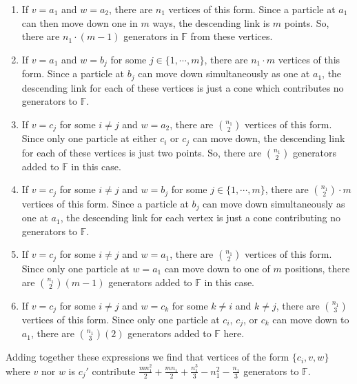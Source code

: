 \begin{enumerate}
    \item If \(v = a_1\) and \(w = a_2\), there are \(n_1\) vertices of this form.
    Since a particle at \(a_1\) can then move down one in \(m\) ways, the descending link is \(m\) points.
    So, there are \(n_1 \cdot (m - 1)\) generators in \(\mathbb{F}\) from these vertices.

    \item If \(v = a_1\) and \(w = b_j\) for some \(j \in \{1, \cdots, m\}\), 
    there are \(n_1 \cdot m\) vertices of this form. 
    Since a particle at \(b_j\) can move down simultaneously as one at \(a_1\), 
    the descending link for each of these vertices is just a cone which contributes no generators to \(\mathbb{F}\).

    \item If \(v = c_j\) for some \(i \neq j\) and \(w = a_2\), 
    there are \(\binom{n_1}{2}\) vertices of this form.
    Since only one particle at either \(c_i\) or \(c_j\) can move down, the descending link for each of these vertices is just two points.
    So, there are \(\binom{n_1}{2}\) generators added to \(\mathbb{F}\) in this case.

    \item If \(v = c_j\) for some \(i \neq j\) and \(w = b_j\) for some \(j \in \{1,\cdots, m\}\), 
        there are \(\binom{n_1}{2} \cdot m\) vertices of this form.
        Since a particle at \(b_j\) can move down simultaneously as one at \(a_1\), the descending link
        for each vertex is just a cone contributing no generators to \(\mathbb{F}\).

    \item If \(v = c_j\) for some \(i \neq j\) and \(w = a_1\), 
        there are \(\binom{n_1}{2}\) vertices of this form.
        Since only one particle at \(w = a_1\) can move down to one of \(m\) positions, 
        there are \(\binom{n_1}{2}(m - 1)\) generators added to \(\mathbb{F}\) in this case.

    \item If \(v = c_j\) for some \(i \neq j\) and \(w = c_k\) for some \(k \neq i\) and \(k \neq j\),
        there are \(\binom{n_1}{3}\) vertices of this form.
        Since only one particle at \(c_i\), \(c_j\), or \(c_k\) can move down to \(a_1\),
        there are \(\binom{n_1}{3}(2)\) generators added to \(\mathbb{F}\) here.
\end{enumerate}
Adding together these expressions we find that vertices of the form \(\{c_i, v, w\}\) where \(v\) nor \(w\) is \(c_j'\)
contribute 
\(\frac{m n_{1}^{2}}{2} + \frac{m n_{1}}{2} + \frac{n_{1}^{3}}{3} - n_{1}^{2} - \frac{n_{1}}{3}\)
generators to \(\mathbb{F}\).

